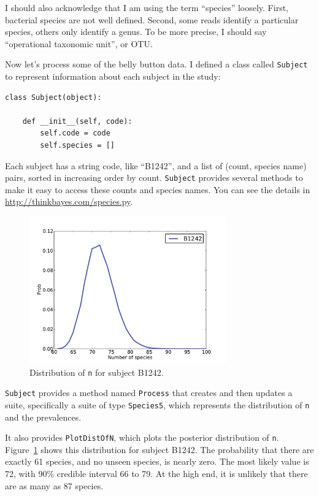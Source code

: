 \documentclass[12pt]{book}
\begin{document}
I should also acknowledge that I am using the term ``species''
loosely.  First, bacterial species are not well defined.  Second,
some reads identify a particular species, others only identify
a genus.  To be more precise, I should say ``operational
taxonomic unit'', or OTU.

Now let's process some of the belly button data.  I defined
a class called {\tt Subject} to represent information about
each subject in the study:

\begin{verbatim}
class Subject(object):

    def __init__(self, code):
        self.code = code
        self.species = []
\end{verbatim}

Each subject has a string code, like ``B1242'', and a list of
(count, species name) pairs, sorted in increasing order by count.
{\tt Subject} provides several methods to make it
easy to access these counts and species names.  You can see the details
in \url{http://thinkbayes.com/species.py}.

\begin{figure}
\centerline{\includegraphics[height=2.5in]{figs/species-ndist-B1242.pdf}}
\caption{Distribution of {\tt n} for subject B1242.}
\label{species-ndist}
\end{figure}

{\tt Subject} provides a method named {\tt Process} that creates and
then updates a suite, specifically a suite of type {\tt Species5},
which represents the distribution of {\tt n} and the prevalences.

It also provides {\tt PlotDistOfN}, which plots the posterior
distribution of {\tt n}.  Figure~\ref{species-ndist} shows this
distribution for subject B1242.  The probability that there are
exactly 61 species, and no unseen species, is nearly zero.  The most
likely value is 72, with 90\% credible interval 66 to 79.  At the high
end, it is unlikely that there are as many as 87 species.
\end{document}
